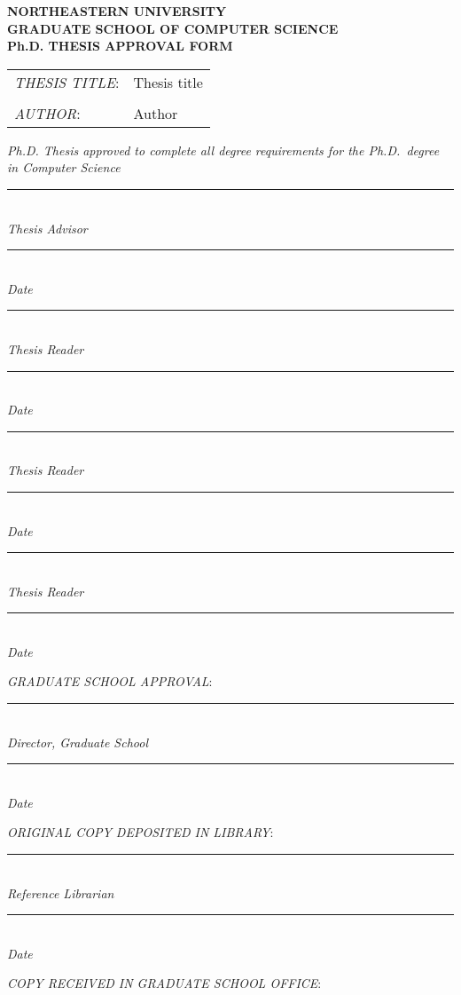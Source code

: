 \documentclass[12pt,oneside]{article}
\newcommand {\Sigline}[1] {\noindent \begin{minipage}{4in}
    \rule {4 in} {0.4 pt} \\
    \centering \emph{#1}
  \end {minipage}
  \hfill
  \begin{minipage} {1.5 in}
    \rule {1.5 in} {0.4 pt} \\
    \centering \emph{Date}
  \end{minipage}}
\newcommand {\Gap}{\vspace{22pt}}
\newcommand {\Smallgap}{\vspace {10pt}}
\begin{document}
\pagestyle {empty}

\vskip -1cm

\begin{centering}
  \bfseries
  NORTHEASTERN UNIVERSITY \\
  GRADUATE SCHOOL OF COMPUTER SCIENCE\\
  Ph.D. THESIS APPROVAL FORM\\
\end{centering}

\vspace {2em}

\noindent
\begin{tabular}{ll}
  \emph{THESIS TITLE}: & Thesis title \\
  & \\
  \emph{AUTHOR}: & Author \\
\end{tabular}

\vspace {2 em}

\noindent \emph{\small Ph.D. Thesis approved to complete all degree requirements for the Ph.D.\ degree in Computer Science}

\Smallgap


\Gap

\Sigline {Thesis Advisor}

\Gap

\Sigline {Thesis Reader}

\Gap

\Sigline {Thesis Reader}

\Gap

\Sigline {Thesis Reader}

\Gap

\noindent \emph{GRADUATE SCHOOL APPROVAL}:

\Gap

\Sigline {Director, Graduate School}

\Gap

\noindent \emph{\uppercase{Original copy deposited in library}}:

\Gap

\Sigline {Reference Librarian}

\Gap

\noindent \emph{\uppercase{Copy received in graduate school office}}:

\Gap
\end{document}

